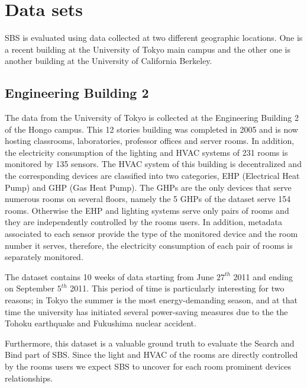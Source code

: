\section{Data sets}
SBS is evaluated using data collected at two different geographic locations.
One is a recent building at the University of Tokyo main campus and the other one is another building at the University of California Berkeley.

\subsection{Engineering Building 2} \label{data:engbldg2}
The data from the University of Tokyo is collected at the Engineering Building 2 of the Hongo campus. 
This 12 stories building was completed in 2005 and is now hosting classrooms, laboratories, professor offices and server rooms.
In addition, the electricity consumption of the lighting and HVAC systems of 231 rooms is monitored by 135 sensors.
The HVAC system of this building is decentralized and the corresponding devices are classified into two categories, EHP (Electrical Heat Pump) and GHP (Gas Heat Pump).
The GHPs are the only devices that serve numerous rooms on several floors, namely the 5 GHPs of the dataset serve 154 rooms.
Otherwise the EHP and lighting systems serve only pairs of rooms and they are independently controlled by the rooms users.
In addition, metadata associated to each sensor provide the type of the monitored device and the room number it serves, therefore, the electricity consumption of each pair of rooms is separately monitored.

The dataset contains 10 weeks of data starting from June $27^{th}$ 2011 and ending on September $5^{th}$ 2011.
This period of time is particularly interesting for two reasons; in Tokyo the summer is the most energy-demanding season, and at that time the university has initiated several power-saving measures due to the the Tohoku earthquake and Fukushima nuclear accident.

Furthermore, this dataset is a valuable ground truth to evaluate the Search and Bind part of SBS.
Since the light and HVAC of the rooms are directly controlled by the rooms users we expect SBS to uncover for each room prominent devices relationships.

